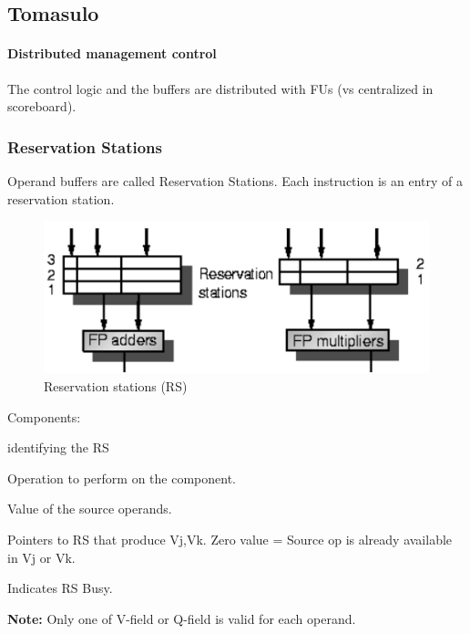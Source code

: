 \subsection{Tomasulo}\label{subsec:tomasulo}
\paragraph{Distributed management control} The control logic and the buffers are distributed with FUs (vs centralized in
scoreboard).

\subsubsection{Reservation Stations}
Operand buffers are called Reservation Stations.
Each instruction is an entry of a reservation station.
\begin{figure}[h]
    \centering
    \includegraphics[scale = 0.4]{images/reservation-station}
    \caption{Reservation stations (RS)}
    \label{fig:reservation-stations}
\end{figure}
Components:
\begin{description}[style=multiline,leftmargin=2cm,font=\normalfont]
    \item[Tag] identifying the RS
    \item[OP] Operation to perform on the component.
    \item[Vj,Vk] Value of the source operands.
    \item[Qj,Qk] Pointers to RS that produce Vj,Vk. Zero value = Source op is already available in Vj or Vk.
    \item[Busy] Indicates RS Busy.
\end{description}
\textbf{Note:} Only one of V-field or Q-field is valid for each operand.\\

